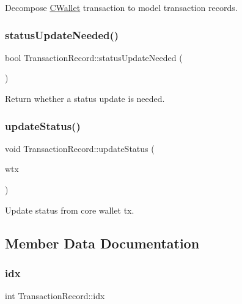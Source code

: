 Decompose \mbox{\hyperlink{class_c_wallet}{C\+Wallet}} transaction to model transaction records. \mbox{\label{class_transaction_record_aaca6757b7b300151694021be6af18d11}} 
\subsubsection{\texorpdfstring{status\+Update\+Needed()}{statusUpdateNeeded()}}
{\footnotesize\ttfamily bool Transaction\+Record\+::status\+Update\+Needed (\begin{DoxyParamCaption}{ }\end{DoxyParamCaption})}

Return whether a status update is needed. \mbox{\label{class_transaction_record_a9b643dd885a790ae511705a1446556be}} 
\subsubsection{\texorpdfstring{update\+Status()}{updateStatus()}}
{\footnotesize\ttfamily void Transaction\+Record\+::update\+Status (\begin{DoxyParamCaption}\item[{const \mbox{\hyperlink{class_c_wallet_tx}{C\+Wallet\+Tx}} \&}]{wtx }\end{DoxyParamCaption})}

Update status from core wallet tx. 

\subsection{Member Data Documentation}
\mbox{\label{class_transaction_record_a143da419e3dc0bc2ec73e22b3a56d1c9}} 
\subsubsection{\texorpdfstring{idx}{idx}}
{\footnotesize\ttfamily int Transaction\+Record\+::idx}

